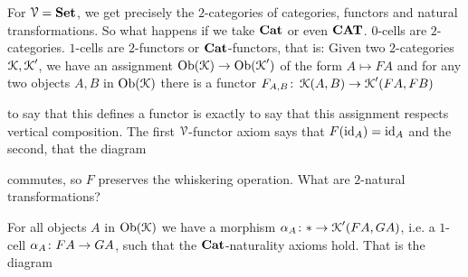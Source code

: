 \documentclass[a4paper,11pt,oneside,openany]{scrbook}
\begin{document}
\begin{exmp}
   For $\operatorname{\mathcal{V}}={\normalfont\textbf{Set}}$, we get precisely the $2$-categories of categories, functors and natural transformations. So what happens if we take ${\normalfont\textbf{Cat}}$ or even ${\normalfont\textbf{CAT}}$. 
   $0$-cells are $2$-categories. $1$-cells are $2$-functors or ${\normalfont\textbf{Cat}}$-functors, that is: Given two $2$-categories $\operatorname{\mathcal{K}},\operatorname{\mathcal{K}}'$, we have an assignment 
   $\operatorname{Ob}(\operatorname{\mathcal{K}}) \to \operatorname{Ob}(\operatorname{\mathcal{K}}')$ of the form $A \mapsto FA$ and for any two objects $A,B$ in $\operatorname{Ob}(\operatorname{\mathcal{K}})$ there is a functor $F_{A,B} \colon \operatorname{\mathcal{K}}(A,B) \to \operatorname{\mathcal{K}}'(FA,FB)$
      \begin{center}
      \end{center}
    to say that this defines a functor is exactly to say that this assignment respects vertical composition. The first $\operatorname{\mathcal{V}}$-functor axiom says that $F(\operatorname{id}_{A}) =\operatorname{id}_{A}$
    and the second, that the diagram 
       \begin{center}
       \end{center}
    commutes, so $F$ preserves the whiskering operation. What are $2$-natural transformations?
       \begin{center}
       \end{center}
    For all objects $A$ in $\operatorname{Ob}(\operatorname{\mathcal{K}})$ we have a morphism $\alpha_{A} \colon \ast \to \operatorname{\mathcal{K}}'(FA,GA)$, i.e. a $1$-cell $\alpha_{A} \colon FA \to GA$, such that
    the ${\normalfont\textbf{Cat}}$-naturality axioms hold. That is the diagram 
       \begin{center}
\end{center}
\end{exmp}
\end{document}
